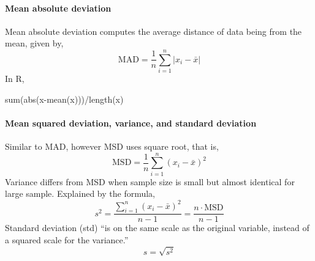 \paragraph{Mean absolute deviation}
    Mean absolute deviation computes the average distance of data being from the mean, given by,
    \begin{equation}
        \mathrm{MAD}=\frac1n\sum_{i=1}^{n}|x_i-\bar{x}|
    \end{equation}
    In R,
    \begin{Rblock}
        sum(abs(x-mean(x)))/length(x)
    \end{Rblock}
\paragraph{Mean squared deviation, variance, and standard deviation}
    Similar to MAD, however MSD uses square root, that is,
    \begin{equation}
        \mathrm{MSD}=\frac1n\sum_{i=1}^{n}(x_i-\bar{x})^2
    \end{equation}
    Variance differs from MSD when sample size is small but almost identical for large sample. Explained by the formula,
    \begin{equation}\label{eq:GenericVarianceEquation}
        s^2=\frac{\sum_{i=1}^{n}(x_i-\bar{x})^2}{n-1}=\frac{n\cdot\mathrm{MSD}}{n-1}
    \end{equation} 
    Standard deviation (std) ``is on the same scale as the original variable, instead of a squared scale for the variance.''
    \begin{equation}
        s=\sqrt{s^2}
    \end{equation}
